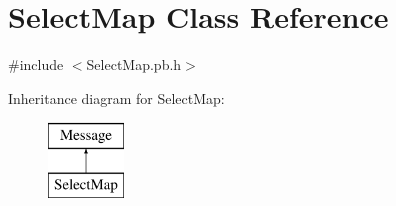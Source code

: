 \hypertarget{class_select_map}{\section{Select\-Map Class Reference}
\label{class_select_map}
}


{\ttfamily \#include $<$Select\-Map.\-pb.\-h$>$}

Inheritance diagram for Select\-Map\-:\begin{figure}[H]
\begin{center}
\leavevmode
\includegraphics[height=2.000000cm]{class_select_map}
\end{center}
\end{figure}
